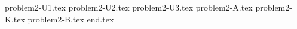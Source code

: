 \documentclass{../../../../style/mkimain}
\begin{document}
{problem2-U1.tex}
{problem2-U2.tex}
{problem2-U3.tex}
{problem2-A.tex}
{problem2-K.tex}
{problem2-B.tex}
{end.tex}
\end{document}
